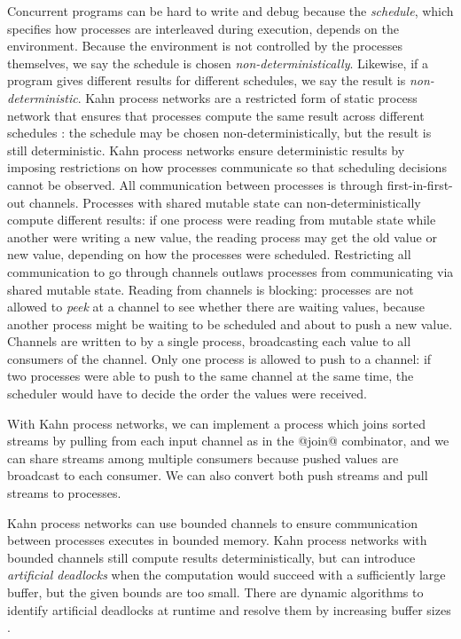 Concurrent programs can be hard to write and debug because the \emph{schedule}, which specifies how processes are interleaved during execution, depends on the environment.
Because the environment is not controlled by the processes themselves, we say the schedule is chosen \emph{non-deterministically}.
Likewise, if a program gives different results for different schedules, we say the result is \emph{non-deterministic}.
Kahn process networks are a restricted form of static process network that ensures that processes compute the same result across different schedules \cite{kahn1976coroutines}: the schedule may be chosen non-deterministically, but the result is still deterministic.
Kahn process networks ensure deterministic results by imposing restrictions on how processes communicate so that scheduling decisions cannot be observed.
All communication between processes is through first-in-first-out channels.
Processes with shared mutable state can non-deterministically compute different results: if one process were reading from mutable state while another were writing a new value, the reading process may get the old value or new value, depending on how the processes were scheduled.
Restricting all communication to go through channels outlaws processes from communicating via shared mutable state.
Reading from channels is blocking: processes are not allowed to \emph{peek} at a channel to see whether there are waiting values, because another process might be waiting to be scheduled and about to push a new value.
Channels are written to by a single process, broadcasting each value to all consumers of the channel.
Only one process is allowed to push to a channel: if two processes were able to push to the same channel at the same time, the scheduler would have to decide the order the values were received.

With Kahn process networks, we can implement a process which joins sorted streams by pulling from each input channel as in the @join@ combinator, and we can share streams among multiple consumers because pushed values are broadcast to each consumer.
We can also convert both push streams and pull streams to processes.

Kahn process networks can use bounded channels to ensure communication between processes executes in bounded memory.
Kahn process networks with bounded channels still compute results deterministically, but can introduce \emph{artificial deadlocks} when the computation would succeed with a sufficiently large buffer, but the given bounds are too small.
There are dynamic algorithms to identify artificial deadlocks at runtime and resolve them by increasing buffer sizes \cite{parks1995bounded,geilen2003requirements}.


